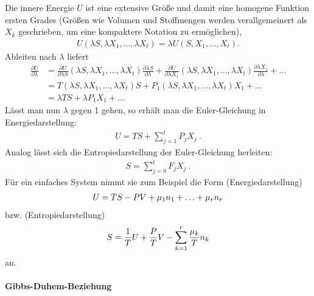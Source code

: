 Die innere Energie $U$ ist eine extensive Größe und damit eine homogene Funktion ersten Grades (Größen wie Volumen und Stoffmengen werden verallgemeinert als $X_k$ geschrieben, um eine kompaktere Notation zu ermöglichen),
\begin{align*}
    U(\lambda S,\lambda X_1,\ldots,\lambda X_t) = \lambda U(S,X_1,\ldots,X_t).
\end{align*}
Ableiten nach $\lambda$ liefert
\begin{align*}
    \frac{\partial U}{\partial\lambda} & = \frac{\partial U}{\partial\lambda S}(\lambda S,\lambda X_1,\ldots,\lambda X_t) \frac{\partial\lambda S}{\partial\lambda} + \frac{\partial U}{\partial\lambda X_1}(\lambda S,\lambda X_1,\ldots,\lambda X_t) \frac{\partial\lambda X_1}{\partial\lambda} + \ldots \\
                                       & = T(\lambda S,\lambda X_1,\ldots,\lambda X_t)S + P_1 (\lambda S,\lambda X_1,\ldots,\lambda X_t) X_1 + \ldots                                                                                                                                                       \\
                                       & = \lambda TS + \lambda P_1X_1 + \ldots
\end{align*}
Lässt man nun $\lambda$ gegen 1 gehen, so erhält man die Euler-Gleichung in Energiedarstellung:
\begin{align}
    \label{eq:euler_gleichung_energiedarstellung}
    \boxed{U = TS + \sum_{j=1}^t P_j X_j}\:.
\end{align}
Analog lässt sich die Entropiedarstellung der Euler-Gleichung herleiten:
\begin{align}
    \label{eq:euler_gleichung_entropiedarstellung}
    \boxed{S = \sum_{j=0}^t F_j X_j}\:.
\end{align}
Für ein einfaches System nimmt sie zum Beispiel die Form (Energiedarstellung)
\begin{align*}
    U=TS-PV + \mu_1 n_1+\ldots + \mu_r n_r
\end{align*}
bzw. (Entropiedarstellung)
\begin{align*}
    S=\frac{1}{T}U + \frac{P}{T}V - \sum_{k=1}^r \frac{\mu_k}{T}n_k
\end{align*}
an.


\paragraph*{Gibbs-Duhem-Beziehung}

